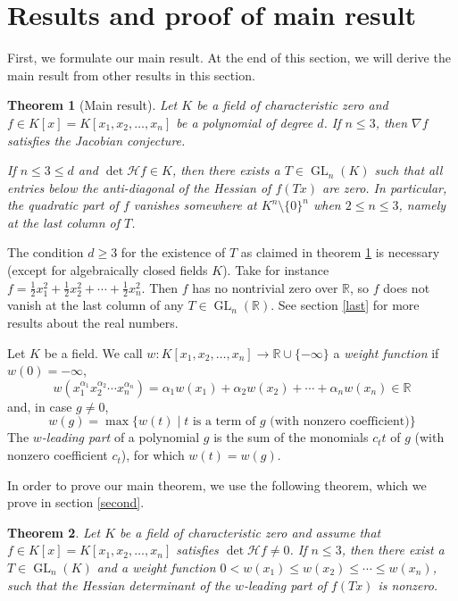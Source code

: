 \documentclass[10pt]{article}
\newtheorem{theorem}{Theorem}[section]
\theoremstyle{remark}
\theoremstyle{definition}
\newcommand{\hess}{{\mathcal H}}
\newcommand{\grad}{\nabla}
\newcommand{\GL}{\operatorname{GL}}
\newcommand{\R}{{\mathbb R}}
\begin{document}
\section{Results and proof of main result} \label{first}

First, we formulate our main result. At the end of this section, we will derive the main result 
from other results in this section.

\begin{theorem}[Main result] \label{dillenext}
Let $K$ be a field of characteristic zero and $f \in K[x] = K[x_1,x_2,\ldots,x_n]$ 
be a polynomial of degree $d$. If $n \le 3$, then $\grad f$ satisfies the Jacobian conjecture.

If $n \le 3 \le d$ and $\det \hess f \in K$, then there exists a $T \in \GL_n(K)$ such that all 
entries below the anti-diagonal of the Hessian of $f(Tx)$ are zero. In particular, the quadratic 
part of $f$ vanishes somewhere at $K^n \setminus \{0\}^n$ when $2 \le n \le 3$, namely at the last 
column of $T$.
\end{theorem}

\noindent
The condition $d \ge 3$ for the existence of $T$ as claimed in theorem \ref{dillenext} is 
necessary (except for algebraically closed fields $K$).
Take for instance $f = \frac12 x_1^2 + \frac12 x_2^2 + \cdots + \frac12 x_n^2$. Then $f$ has no
nontrivial zero over $\R$, so $f$ does not vanish at the last column of any $T \in \GL_n(\R)$.
See section \ref{last} for more results about the real numbers.

Let $K$ be a field. We call $w: K[x_1,x_2,\ldots,x_n] \rightarrow \R \cup \{-\infty\}$ 
a {\em weight function} if $w(0) = -\infty$,
$$
w(x_1^{\alpha_1}x_2^{\alpha_2}\cdots x_n^{\alpha_n}) = 
\alpha_1 w(x_1) + \alpha_2 w(x_2) + \cdots + \alpha_n w(x_n) \in \R
$$ 
and, in case $g \ne 0$,
$$
w(g) = \max\{w(t)\mid \mbox{$t$ is a term of $g$ (with nonzero coefficient)}\}
$$
The {\em $w$-leading part} of a polynomial $g$ is the sum of the monomials $c_t t$ of $g$ 
(with nonzero coefficient $c_t$), for which $w(t) = w(g)$.

In order to prove our main theorem, we use the following theorem, which we prove in section
\ref{second}.

\begin{theorem} \label{weight}
Let $K$ be a field of characteristic zero and assume that $f \in K[x] = K[x_1,x_2,\ldots,x_n]$
satisfies $\det \hess f \ne 0$. If $n \le 3$, then there exist a $T \in \GL_n(K)$ and 
a weight function $0 < w(x_1) \le w(x_2) \le \cdots \le w(x_n)$, such that the Hessian determinant 
of the $w$-leading part of $f(Tx)$ is nonzero.
\end{theorem}
\end{document}
